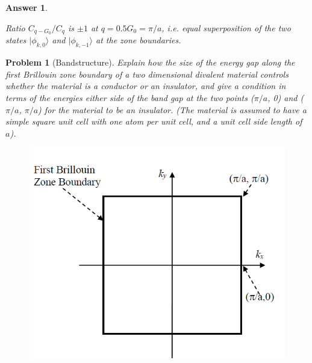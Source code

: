 \documentclass[a4paper]{article}
\newtheorem{ans}{Answer}[section]
\theoremstyle{new}
\newtheorem{qns}{Problem}[section]
\begin{document}
\begin{ans}
\begin{center}
\end{center}
Ratio $C_{q-G_0}/C_q$ is $\pm 1$ at $q=0.5G_0=\pi/a$, i.e. equal superposition of the two states $|\phi_{k,0}\rangle$ and $|\phi_{k,-1}\rangle$ at the zone boundaries.
\end{ans}
\begin{qns}[Bandstructure]
Explain how the size of the energy gap along the first Brillouin zone boundary of a two dimensional divalent material controls whether the material is a conductor or an insulator, and give a condition in terms of the energies either side of the band gap at the two points ($\pi/a$, 0) and ($\pi/a$, $\pi/a$) for the material to be an insulator. (The material is assumed to have a simple square unit cell with one atom per unit cell, and a unit cell side length of $a$).
\begin{figure}[H]
    \centering
    \includegraphics[scale=0.4]{4_8_2.PNG}
\end{figure}
\end{qns}
\end{document}
